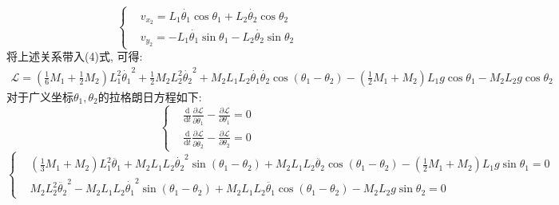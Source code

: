 \documentclass[10.5pt,a4paper]{ctexart}
\begin{document}
\begin{equation}
\left \{ 
  \begin{aligned}
  &v_{x_2} = L_1\dot{\theta_1}\cos{\theta_1} + L_2\dot{\theta_2}\cos{\theta_2}\\
  &v_{y_2} = -L_1\dot{\theta_1}\sin{\theta_1} - L_2\dot{\theta_2}\sin{\theta_2}
  \end{aligned}
\right.
\end{equation}
将上述关系带入(4)式, 可得:
\begin{equation}
\begin{split}
\mathcal{L} = \left(\frac{1}{6}M_1 + \frac{1}{2}M_2\right)L_1^2\dot{\theta_1}^2 + \frac{1}{2}M_2 L_2^2 \dot{\theta_2}^2 + M_2L_1L_2 \dot{\theta_1} \dot{\theta_2}\cos{\left(\theta_1 - \theta_2\right)} - \left(\frac{1}{2}M_1 + M_2\right)L_1 g \cos{\theta_1} - M_2 L_2 g \cos{\theta_2}
\end{split}
\end{equation}
对于广义坐标$\theta_1, \theta_2$的拉格朗日方程如下:
\begin{equation}
\left \{ 
  \begin{aligned}
  &\frac{\mathrm{d}}{\mathrm{d}t} \frac{\partial{\mathcal{L}}}{\partial{\dot{\theta_1}}} - \frac{\partial{\mathcal{L}}}{\partial{\theta_1}} = 0\\
  &\frac{\mathrm{d}}{\mathrm{d}t} \frac{\partial{\mathcal{L}}}{\partial{\dot{\theta_2}}} - \frac{\partial{\mathcal{L}}}{\partial{\theta_2}} = 0
  \end{aligned}
\right.
\end{equation}
\begin{equation}
\left \{ 
  \begin{aligned}
  &\left(\frac{1}{3}M_1 + M_2\right) L_1^2 \ddot{\theta_1} + M_2 L_1 L_2 \dot{\theta_2}^2 \sin\left(\theta_1 - \theta_2\right) + M_2 L_1 L_2 \ddot{\theta_2}\cos{\left(\theta_1 - \theta_2\right)} - (\frac{1}{2}M_1 + M_2) L_1 g \sin{\theta_1} = 0\\
  &M_2 L_2^2 \ddot{\theta_2}^2 - M_2 L_1 L_2 \dot{\theta_1}^2 \sin{\left(\theta_1 - \theta_2\right)} + M_2 L_1 L_2 \ddot{\theta_1}\cos{\left(\theta_1 - \theta_2\right)} - M_2 L_2 g \sin{\theta_2} = 0
  \end{aligned}
\right.
\end{equation}
\end{document}
